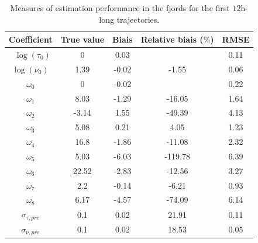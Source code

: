 \documentclass[11pt]{article}
\newcommand {\1}{\mathbb{1}}
\theoremstyle{definition}
\theoremstyle{remark}
\theoremstyle{remark}
\begin{document}
\begin{table}[H]
	\centering
	\begin{tabular}{|c|c|c|c|c|}
		\hline
		Coefficient  & True value  & Biais & Relative biais ($\%$) & RMSE \\
		\hline
		 $\log(\tau_0)$   & 0     & 0.03  &         & 0.11 \\
		$\log(\nu_0)$     & 1.39  & -0.02 & -1.55     & 0.06 \\
		$\omega_0$   & 0     & -0.02 &    & 0.22 \\
		$\omega_1$ & 8.03  & -1.29 & -16.05    & 1.64 \\
		$\omega_2$ & -3.14 & 1.55  & -49.39    & 4.13 \\
		$\omega_3$ & 5.08  & 0.21  & 4.05      & 1.23 \\
		$\omega_4$ & 16.8  & -1.86 & -11.08    & 2.32 \\
		$\omega_5$ & 5.03  & -6.03 & -119.78   & 6.39 \\
		$\omega_6$ & 22.52 & -2.83 & -12.56    & 3.27 \\
		$\omega_7$ & 2.2   & -0.14 & -6.21     & 0.93 \\
		$\omega_8$ & 6.17  & -4.57 & -74.09    & 6.14 \\
		$\sigma_{\tau,pre}$  & 0.1   & 0.02  & 21.91     & 0.11 \\
		$\sigma_{\nu,pre}$    & 0.1   & 0.02  & 18.53     & 0.05 \\
		\hline
	\end{tabular}
	\caption{Measures of estimation performance in the fjords for the first $12$h-long trajectories.}
\label{table: estimation performance fjords 12h}
\end{table}
\end{document}
